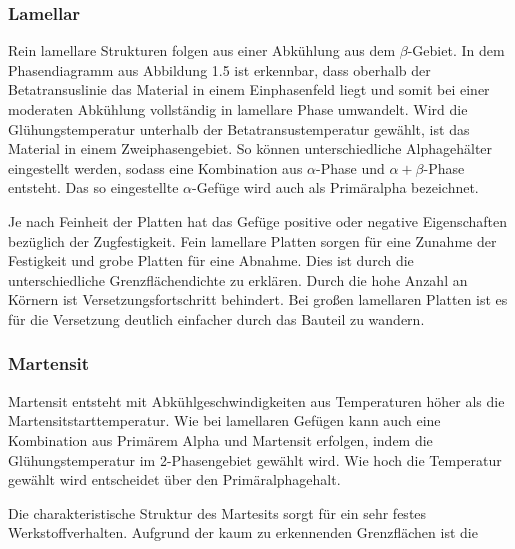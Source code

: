\documentclass[a4paper, 11pt]{tubsreprt}
\begin{document}
\subsubsection{Lamellar}
Rein lamellare Strukturen folgen aus einer Abkühlung aus dem $\beta$-Gebiet. In dem Phasendiagramm aus Abbildung 1.5 ist erkennbar, dass oberhalb der Betatransuslinie das Material in einem Einphasenfeld liegt und somit bei einer moderaten Abkühlung vollständig in lamellare Phase umwandelt. Wird die Glühungstemperatur unterhalb der Betatransustemperatur gewählt, ist das Material in einem Zweiphasengebiet. So können unterschiedliche Alphagehälter eingestellt werden, sodass eine Kombination aus $\alpha$-Phase und $\alpha + \beta$-Phase entsteht. Das so eingestellte $\alpha$-Gefüge wird auch als Primäralpha bezeichnet. 


Je nach Feinheit der Platten hat das Gefüge positive oder negative Eigenschaften bezüglich der Zugfestigkeit. Fein lamellare Platten sorgen für eine Zunahme der Festigkeit und grobe Platten für eine Abnahme. Dies ist durch die unterschiedliche Grenzflächendichte zu erklären. Durch die hohe Anzahl an Körnern ist Versetzungsfortschritt behindert. Bei großen lamellaren Platten ist es für die Versetzung deutlich einfacher durch das Bauteil zu wandern. 

\subsubsection{Martensit}
Martensit entsteht mit Abkühlgeschwindigkeiten aus Temperaturen höher als die Martensitstarttemperatur. Wie bei lamellaren Gefügen kann auch eine Kombination aus Primärem Alpha und Martensit erfolgen, indem die Glühungstemperatur im 2-Phasengebiet gewählt wird. Wie hoch die Temperatur gewählt wird entscheidet über den Primäralphagehalt. 

Die charakteristische Struktur des Martesits sorgt für ein sehr festes Werkstoffverhalten. Aufgrund der kaum zu erkennenden Grenzflächen ist die 





\listoffigures
\listoftables
\end{document}
